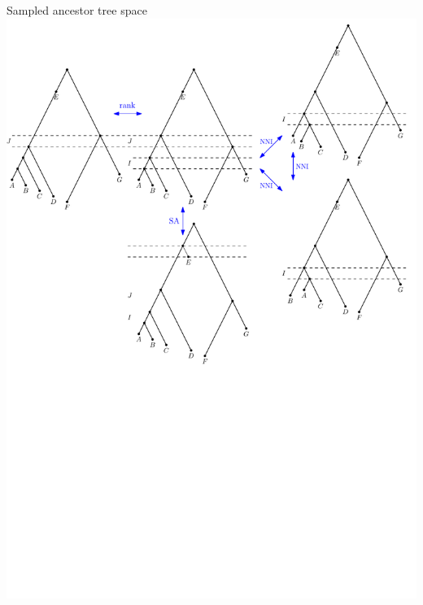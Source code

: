 \documentclass{beamer}
\theoremstyle{example}
\begin{document}
\begin{frame}
\begin{block}{Sampled ancestor tree space}
\includegraphics[width=0.8\framewidth]{SAT}
\end{block}
\end{frame}
\end{document}
